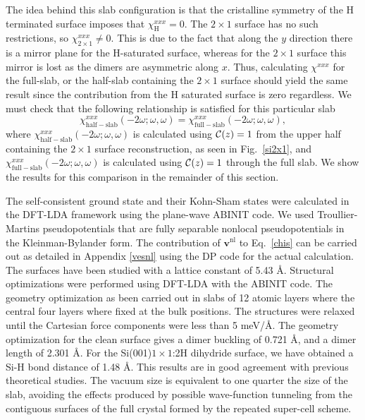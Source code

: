 \documentclass[floatfix,prb,aps,superscriptaddress,showpacs,letterpaper]{revtex4}
\begin{document}
The idea behind this slab configuration is that the 
cristalline symmetry of the H terminated surface imposes that 
$\chi_{\mathrm{H}}^{xxx}=0$.
 The $2\times 1$ surface has no 
such restrictions, so $\chi_{2\times 1}^{xxx}\ne 0$.
This is due to the fact that along the $y$ direction there is a mirror plane for the
H-saturated surface, whereas 
for the $2\times 1$ surface this mirror is lost as the dimers are
asymmetric along $x$. 
Thus, calculating $\chi^{xxx}$ for the full-slab, or the 
half-slab containing the $2\times 1$ surface\cite{note1}
should yield the same result since the contribution from the H
saturated surface is zero regardless. 
We must check that the following 
relationship is satisfied for this particular slab
\begin{equation*}
\chi_{\mathrm{half-slab}}^{xxx}(-2\omega;\omega,\omega) 
=
\chi_{\mathrm{full-slab}}^{xxx}(-2\omega;\omega,\omega) 
,
\end{equation*}
where
$\chi_{\mathrm{half-slab}}^{xxx}(-2\omega;\omega,\omega)$ is calculated using
${\mathbf{\cal C}}(z)=1$ from the upper half containing the $2\times 1$ 
surface reconstruction, as seen in Fig.~\ref{si2x1},
and $\chi_{\mathrm{full-slab}}^{xxx}(-2\omega;\omega,\omega)$ is calculated using
${\mathbf{\cal C}}(z)=1$ through the full slab.
We show the results for this comparison in the remainder 
of this section.


The self-consistent ground state and their Kohn-Sham states were
calculated in the DFT-LDA framework using the plane-wave 
ABINIT code.\cite{abinit}
We used Troullier-Martins pseudopotentials\cite{troullierPRB91} that are 
fully separable nonlocal pseudopotentials in the Kleinman-Bylander 
form.\cite{kleinmanPRL82}
The contribution of $\mathbf{v}^\mathrm{nl}$ to Eq.~\eqref{chis} can be carried out 
as detailed in Appendix \ref{vesnl} using the DP code for 
the actual calculation.\cite{francesco}
%
The surfaces have been studied with a lattice constant of 5.43 \AA. 
Structural optimizations were performed using DFT-LDA
with the ABINIT code.\cite{abinit}  
The geometry optimization as been carried out in slabs of 12
atomic layers where the central four layers where fixed at the bulk
positions.  
The structures were relaxed until the Cartesian force components were less than 5 meV/\AA. 
The geometry optimization for the clean surface gives
a dimer buckling of 0.721 \AA, and a dimer length of 2.301 \AA.  
For the  Si(001)$1\times 1$:2H dihydride surface, we have obtained a Si-H bond distance of 1.48 \AA. 
This results are in good agreement with previous 
theoretical studies.\cite{caramellaPRB09,mendozaPRB06}
The vacuum size is equivalent to one quarter the
size of the slab, avoiding the effects produced by possible 
wave-function tunneling from the contiguous surfaces of the full
crystal formed by the repeated super-cell scheme.\cite{mendozaPRB06}    
\end{document}
